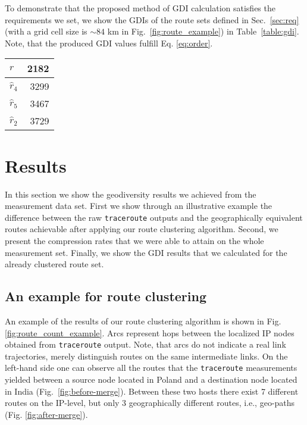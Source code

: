 \documentclass[peerreview]{IEEEtran}
\begin{document}
To demonstrate that the proposed method of GDI calculation satisfies the
requirements we set, we show the GDIs of the route sets defined in
Sec.~\ref{sec:req} (with a grid cell size is $\sim84$ km in
Fig.~\ref{fig:route_example}) in Table~\ref{table:gdi}. Note, that the produced
GDI values fulfill Eq. \ref{eq:order}.

\begin{center}
  \begin{tabular}{ l | r }
    $r$ & 2182 \\ \hline
    $\hat{r}_4$ & 3299 \\ \hline
    $\hat{r}_5$& 3467  \\ \hline
    $\hat{r}_2$& 3729 \\ 
  \end{tabular}
  
  \label{table:gdi}
\end{center}
 

\section{Results}
\label{sec:results}

In this section we show the geodiversity results we achieved from the
measurement data set. First we show through an illustrative example the
difference between the raw \texttt{traceroute} outputs and the geographically
equivalent routes achievable after applying our route clustering algorithm.
Second, we present the compression rates that we were able to attain on the
whole measurement set. Finally, we show the GDI results that we calculated for
the already clustered route set.

\subsection{An example for route clustering}

An example of the results of our route clustering algorithm is shown in Fig.
\ref{fig:route_count_example}. Arcs represent hops between the localized IP
nodes obtained from \texttt{traceroute} output. Note, that arcs do not indicate
a real link trajectories, merely distinguish routes on the same intermediate
links. On the left-hand side one can observe all the routes that the
\texttt{traceroute} measurements yielded between a source node located in Poland
and a destination node located in India (Fig.~\ref{fig:before-merge}). Between
these two hosts there exist 7 different routes on the IP-level, but only 3
geographically different routes, i.e., geo-paths (Fig. \ref{fig:after-merge}).
\end{document}
